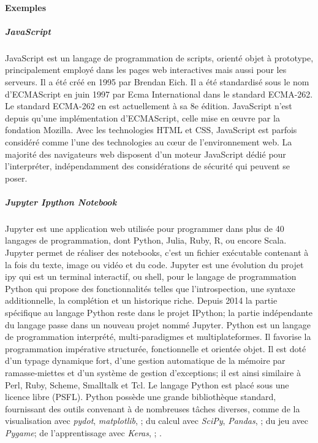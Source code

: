             \paragraph{Exemples}
                \subparagraph{JavaScript}
                    JavaScript est un langage de programmation de scripts, orienté objet à prototype, principalement employé dans les pages web interactives mais aussi pour les serveurs. Il a été créé en 1995 par Brendan Eich. Il a été standardisé sous le nom d'ECMAScript en juin 1997 par Ecma International dans le standard ECMA-262. Le standard ECMA-262 en est actuellement à sa 8e édition. JavaScript n'est depuis qu'une implémentation d'ECMAScript, celle mise en œuvre par la fondation Mozilla. %
                    Avec les technologies HTML et CSS, JavaScript est parfois considéré comme l'une des technologies au cœur de l'environnement web. La majorité des navigateurs web disposent d'un moteur JavaScript dédié pour l'interpréter, indépendamment des considérations de sécurité qui peuvent se poser.
                \subparagraph{Jupyter Ipython Notebook}
                    Jupyter est une application web utilisée pour programmer dans plus de 40 langages de programmation, dont Python, Julia, Ruby, R, ou encore Scala. Jupyter permet de réaliser des notebooks, c'est un fichier exécutable contenant à la fois du texte, image ou vidéo et du code. Jupyter est une évolution du projet \glsdesc{ipy} qui est un terminal interactif, ou shell, pour le langage de programmation Python qui propose des fonctionnalités telles que l'introspection, une syntaxe additionnelle, la complétion et un historique riche. Depuis 2014 la partie spécifique au langage Python reste dans le projet IPython; la partie indépendante du langage passe dans un nouveau projet nommé Jupyter. 
                    Python est un langage de programmation interprété, multi-paradigmes et multiplateformes. Il favorise la programmation impérative structurée, fonctionnelle et orientée objet. Il est doté d'un typage dynamique fort, d'une gestion automatique de la mémoire par ramasse-miettes et d'un système de gestion d'exceptions; il est ainsi similaire à Perl, Ruby, Scheme, Smalltalk et Tcl. Le langage Python est placé sous une licence libre (PSFL).
                    Python possède une grande bibliothèque standard, fournissant des outils convenant à de nombreuses tâches diverses, comme de la visualisation avec \textit{pydot}, \textit{matplotlib}, \etc; du calcul avec \textit{SciPy}, \textit{Pandas}, \etc; du jeu avec \textit{Pygame}; de l'apprentissage avec \textit{Keras}, \etc; \etc.
